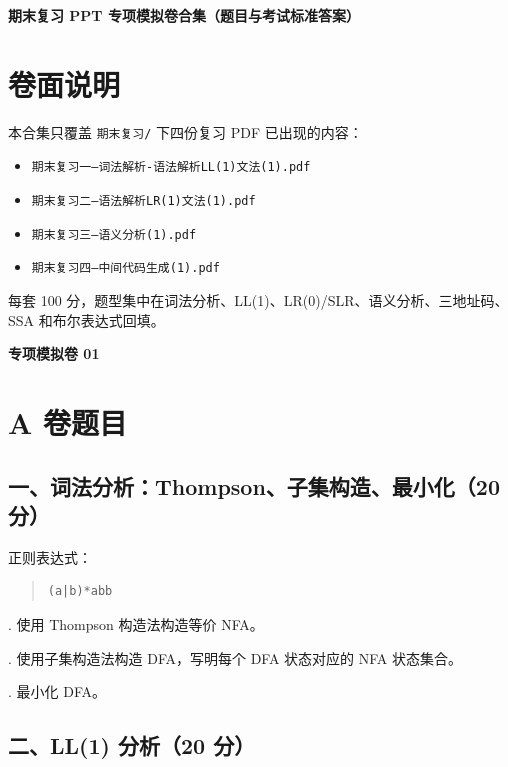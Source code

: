 \documentclass[UTF8,zihao=-4]{ctexart}
\begin{document}
\clearpage
\begin{center}
{\bfseries 期末复习 PPT 专项模拟卷合集（题目与考试标准答案）}
\end{center}

\section*{卷面说明}

本合集只覆盖 \texttt{期末复习/} 下四份复习 PDF 已出现的内容：

\begin{itemize}
\item \texttt{期末复习一--词法解析-语法解析LL(1)文法(1).pdf}
\item \texttt{期末复习二--语法解析LR(1)文法(1).pdf}
\item \texttt{期末复习三--语义分析(1).pdf}
\item \texttt{期末复习四--中间代码生成(1).pdf}
\end{itemize}

每套 100 分，题型集中在词法分析、LL(1)、LR(0)/SLR、语义分析、三地址码、SSA 和布尔表达式回填。

\clearpage
\begin{center}
{\bfseries 专项模拟卷 01}
\end{center}

\section*{A 卷题目}

\subsection*{一、词法分析：Thompson、子集构造、最小化（20 分）}

正则表达式：

\begin{quote}
\footnotesize
\begin{verbatim}
(a|b)*abb
\end{verbatim}
\end{quote}

. 使用 Thompson 构造法构造等价 NFA。\par
{}. 使用子集构造法构造 DFA，写明每个 DFA 状态对应的 NFA 状态集合。\par
{}. 最小化 DFA。\par

\subsection*{二、LL(1) 分析（20 分）}
\end{document}
